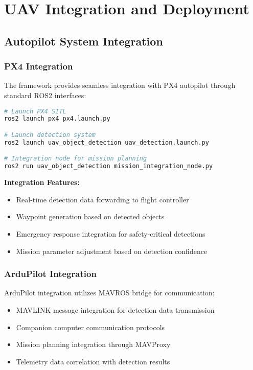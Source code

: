 \documentclass[11pt,a4paper]{article}
\begin{document}
\section{UAV Integration and Deployment}

\subsection{Autopilot System Integration}

\subsubsection{PX4 Integration}

The framework provides seamless integration with PX4 autopilot through standard ROS2 interfaces:

\begin{lstlisting}[language=bash, caption=PX4 Integration Example]
# Launch PX4 SITL
ros2 launch px4 px4.launch.py

# Launch detection system
ros2 launch uav_object_detection uav_detection.launch.py

# Integration node for mission planning
ros2 run uav_object_detection mission_integration_node.py
\end{lstlisting}

\textbf{Integration Features:}
\begin{itemize}
    \item Real-time detection data forwarding to flight controller
    \item Waypoint generation based on detected objects
    \item Emergency response integration for safety-critical detections
    \item Mission parameter adjustment based on detection confidence
\end{itemize}

\subsubsection{ArduPilot Integration}

ArduPilot integration utilizes MAVROS bridge for communication:

\begin{itemize}
    \item MAVLINK message integration for detection data transmission
    \item Companion computer communication protocols
    \item Mission planning integration through MAVProxy
    \item Telemetry data correlation with detection results
\end{itemize}
\end{document}
